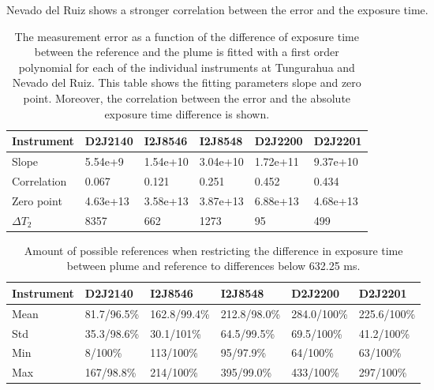 Nevado del Ruiz shows a stronger correlation between the   error and the exposure time.
\begin{table}[h]
	\centering
	\begin{tabular}{|p{2cm}|p{2cm}|p{2cm}|p{2cm}|p{2cm}|p{2cm}|}
		Instrument	&D2J2140&I2J8546& I2J8548&D2J2200&D2J2201\\
		\toprule
		Slope& 5.54e+9&1.54e+10 &3.04e+10&1.72e+11&9.37e+10\\
		\midrule
		Correlation&0.067
		&0.121&
		0.251&
		0.452&
		0.434\\
		\midrule
		Zero point&4.63e+13&3.58e+13& 3.87e+13& 6.88e+13& 4.68e+13\\
		\midrule
		$\Delta T_{2}$&8357&662&1273&95&499\\
		\bottomrule
	\end{tabular}
	\caption{The  measurement error as a function of the difference of exposure time between the reference and the plume is fitted with a first order polynomial for each of the individual instruments at Tungurahua and Nevado del Ruiz. This table shows the fitting parameters slope and zero point. Moreover, the correlation between the  error and the absolute exposure time difference is shown.}
	\label{tab:exptimecalc}
\end{table}

\begin{table}
	\centering
	\begin{tabular}{|p{1.8cm}|p{2.15cm}|p{2.15cm}|p{2.15cm}|p{2.15cm}|p{2.15cm}|}
		Instrument	&D2J2140&I2J8546& I2J8548&D2J2200&D2J2201\\
		\toprule
		Mean&
		81.7/96.5\%		&162.8/99.4\%		&212.8/98.0\%		&284.0/100\%		&225.6/100\% \\
		\midrule
		Std&
		35.3/98.6\%&		30.1/101\%&
		64.5/99.5\% &		69.5/100\% &
		41.2/100\% \\
		\midrule
		Min  &
		8/100\%&113/100\%
		&95/97.9\%
		&64/100\%
		&63/100\%\\
		\midrule
		Max&
		167/98.8\% &
		214/100\% &
		395/99.0\% &
		433/100\%  &
		297/100\% \\
		\bottomrule
	\end{tabular}
	\caption{Amount of possible references when restricting the difference in exposure time  between plume and reference to differences below 632.25 ms.}
	\label{tab:etrest}
\end{table}	


